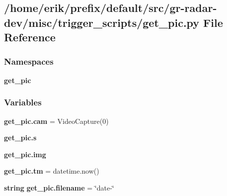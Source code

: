 \subsection{/home/erik/prefix/default/src/gr-\/radar-\/dev/misc/trigger\+\_\+scripts/get\+\_\+pic.py File Reference}
\label{get__pic_8py}
\subsubsection*{Namespaces}
\begin{DoxyCompactItemize}
\item 
 {\bf get\+\_\+pic}
\end{DoxyCompactItemize}
\subsubsection*{Variables}
\begin{DoxyCompactItemize}
\item 
{\bf get\+\_\+pic.\+cam} = Video\+Capture(0)
\item 
{\bf get\+\_\+pic.\+s}
\item 
{\bf get\+\_\+pic.\+img}
\item 
{\bf get\+\_\+pic.\+tm} = datetime.\+now()
\item 
{\bf string} {\bf get\+\_\+pic.\+filename} = \char`\"{}date-\/\char`\"{}
\end{DoxyCompactItemize}
